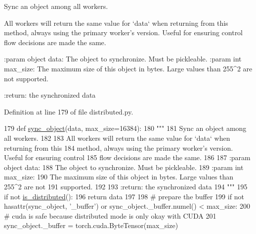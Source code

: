 \begin{DoxyVerb}Sync an object among all workers.

All workers will return the same value for `data` when returning from this
method, always using the primary worker's version. Useful for ensuring control
flow decisions are made the same.

:param object data:
    The object to synchronize. Must be pickleable.
:param int max_size:
    The maximum size of this object in bytes. Large values than 255^2 are not
    supported.

:return: the synchronized data
\end{DoxyVerb}
 

Definition at line 179 of file distributed.\+py.


\begin{DoxyCode}
179 \textcolor{keyword}{def }\hyperlink{namespaceparlai_1_1utils_1_1distributed_a269d3c7284127d9b287b9b61e9161de6}{sync\_object}(data, max\_size=16384):
180     \textcolor{stringliteral}{"""}
181 \textcolor{stringliteral}{    Sync an object among all workers.}
182 \textcolor{stringliteral}{}
183 \textcolor{stringliteral}{    All workers will return the same value for `data` when returning from this}
184 \textcolor{stringliteral}{    method, always using the primary worker's version. Useful for ensuring control}
185 \textcolor{stringliteral}{    flow decisions are made the same.}
186 \textcolor{stringliteral}{}
187 \textcolor{stringliteral}{    :param object data:}
188 \textcolor{stringliteral}{        The object to synchronize. Must be pickleable.}
189 \textcolor{stringliteral}{    :param int max\_size:}
190 \textcolor{stringliteral}{        The maximum size of this object in bytes. Large values than 255^2 are not}
191 \textcolor{stringliteral}{        supported.}
192 \textcolor{stringliteral}{}
193 \textcolor{stringliteral}{    :return: the synchronized data}
194 \textcolor{stringliteral}{    """}
195     \textcolor{keywordflow}{if} \textcolor{keywordflow}{not} \hyperlink{namespaceparlai_1_1utils_1_1distributed_a023acb5e3b66e1f27e21247c35661279}{is\_distributed}():
196         \textcolor{keywordflow}{return} data
197 
198     \textcolor{comment}{# prepare the buffer}
199     \textcolor{keywordflow}{if} \textcolor{keywordflow}{not} hasattr(sync\_object, \textcolor{stringliteral}{'\_buffer'}) \textcolor{keywordflow}{or} sync\_object.\_buffer.numel() < max\_size:
200         \textcolor{comment}{# cuda is safe because distributed mode is only okay with CUDA}
201         sync\_object.\_buffer = torch.cuda.ByteTensor(max\_size)

\end{DoxyCode}
